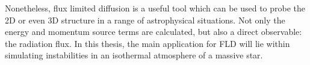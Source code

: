 Nonetheless, flux limited diffusion is a useful tool which can be used to probe the 2D or even 3D structure in a range of astrophysical situations. Not only the energy and momentum source terms are calculated, but also a direct observable: the radiation flux. In this thesis, the main application for FLD will lie within simulating instabilities in an isothermal atmosphere of a massive star.